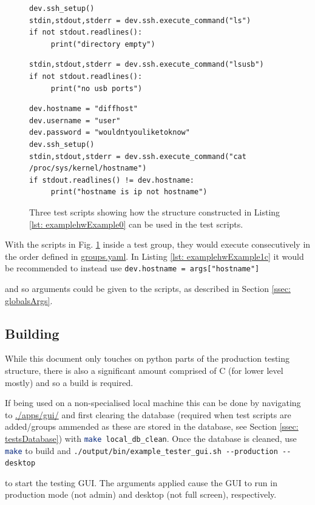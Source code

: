 \documentclass[a4paper,12pt, notitlepage]{article}
\begin{document}
{{{{{{{{{{{{{\begin{figure}[h]
	\begin{lstlisting}[caption={Simple script to setup ssh then use `ls' to remote.},label={lst: examplehwExample1a}]
dev.ssh_setup()
stdin,stdout,stderr = dev.ssh.execute_command("ls")
if not stdout.readlines():
     print("directory empty")
	\end{lstlisting}
	\begin{lstlisting}[caption={Using the existing ssh connection, this script checks usb ports.}, label={lst: examplehwExample1b}]
stdin,stdout,stderr = dev.ssh.execute_command("lsusb")
if not stdout.readlines():
     print("no usb ports")
	\end{lstlisting}
	\begin{lstlisting}[caption={This script changes some class attributes and opens a new ssh connection to a different remote.},label={lst: examplehwExample1c}]
dev.hostname = "diffhost"
dev.username = "user"
dev.password = "wouldntyouliketoknow"
dev.ssh_setup()
stdin,stdout,stderr = dev.ssh.execute_command("cat /proc/sys/kernel/hostname")
if stdout.readlines() != dev.hostname:
     print("hostname is ip not hostname")
     \end{lstlisting}
     \caption{Three test scripts showing how the structure constructed in Listing \ref{lst: examplehwExample0} can be used in the test scripts.}
     \label{lst: examplehwExample1}
\end{figure} 

With the scripts in Fig. \ref{lst: examplehwExample1} inside a test group, they would execute consecutively in the order defined in \url{groups.yaml}. In Listing \ref{lst: examplehwExample1c} it would be recommended to instead use \lstinline{dev.hostname = args["hostname"]}{ and so arguments could be given to the scripts, as described in Section \ref{ssec: globalsArgs}.

\newpage
\subsection{Building}
\label{ssec: buildingStruct}

While this document only touches on python parts of the production testing structure, there is also a significant amount comprised of C (for lower level mostly) and so a build is required. 

If being used on a non-specialised local machine this can be done by navigating to \url{./apps/gui/} and first clearing the database (required when test scripts are added/groups ammended as these are stored in the database, see Section \ref{ssec: testsDatabase}) with \lstinline[language=bash]{make local_db_clean}. Once the database is cleaned, use \lstinline[language=bash]{make} to build and \lstinline{./output/bin/example_tester_gui.sh --production --desktop}{ to start the testing GUI. The arguments applied cause the GUI to run in production mode (not admin) and desktop (not full screen), respectively. 

}}}}}}}}}}}}}}}
\end{document}
